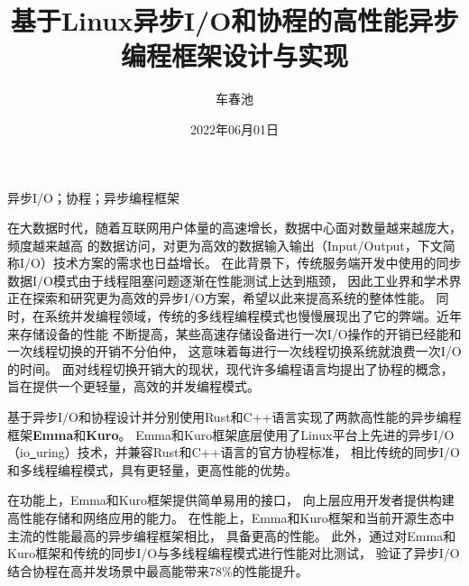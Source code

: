 \documentclass[supercite]{HustGraduPaper}
\title{基于Linux异步I/O和协程的高性能异步编程框架设计与实现}
\author{车春池}
\date{2022年06月01日}
\theoremstyle{definition}
\begin{document}
\maketitle

\statement

\clearpage


\begin{cnabstract}{异步I/O；协程；异步编程框架}

在大数据时代，随着互联网用户体量的高速增长，数据中心面对数量越来越庞大，频度越来越高
的数据访问，对更为高效的数据输入输出（Input/Output，下文简称I/O）技术方案的需求也日益增长。
在此背景下，传统服务端开发中使用的同步数据I/O模式由于线程阻塞问题逐渐在性能测试上达到瓶颈，
因此工业界和学术界正在探索和研究更为高效的异步I/O方案，希望以此来提高系统的整体性能。
同时，在系统并发编程领域，传统的多线程编程模式也慢慢展现出了它的弊端。近年来存储设备的性能
不断提高，某些高速存储设备进行一次I/O操作的开销已经能和一次线程切换的开销不分伯仲，
这意味着每进行一次线程切换系统就浪费一次I/O的时间。
面对线程切换开销大的现状，现代许多编程语言均提出了协程的概念，旨在提供一个更轻量，高效的并发编程模式。\par

基于异步I/O和协程设计并分别使用Rust和C++语言实现了两款高性能的异步编程框架\textbf{Emma}和\textbf{Kuro}。
Emma和Kuro框架底层使用了Linux平台上先进的异步I/O（io\underline{~}uring）技术，并兼容Rust和C++语言的官方协程标准，
相比传统的同步I/O和多线程编程模式，具有更轻量，更高性能的优势。\par

在功能上，Emma和Kuro框架提供简单易用的接口，
向上层应用开发者提供构建高性能存储和网络应用的能力。
在性能上，Emma和Kuro框架和当前开源生态中主流的性能最高的异步编程框架相比，
具备更高的性能。
此外，通过对Emma和Kuro框架和传统的同步I/O与多线程编程模式进行性能对比测试，
验证了异步I/O结合协程在高并发场景中最高能带来78\%的性能提升。\par

\end{cnabstract}
\end{document}
